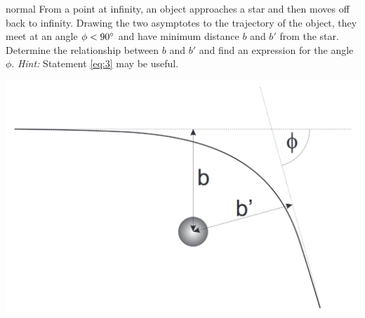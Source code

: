 \documentclass[11pt]{article}
\begin{document}
\begin{solution}{normal}
From a point at infinity, an object approaches a star and then moves off back to infinity. Drawing the two asymptotes to the trajectory of the object, they meet at an angle $\phi<90\degree$ and have minimum distance $b$ and $b'$ from the star. Determine the relationship between $b$ and $b'$ and find an expression for the angle $\phi$. \textit{Hint:} Statement \ref{eq:3} may be useful.
\begin{center}
    \includegraphics[width=0.6\linewidth]{Images/CM4.png}
\end{center}
\end{solution}
\vspace{-4mm}
\end{document}
